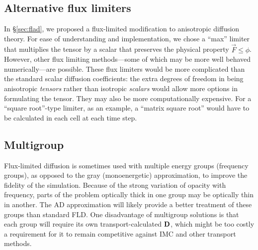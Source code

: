 \subsection{Alternative flux limiters}

In \S\ref{sec:flad}, we proposed a flux-limited modification to anisotropic
diffusion theory. For ease of understanding and implementation, we chose a
``max'' limiter that multiplies the tensor by a scalar that preserves the
physical property $\vec{F} \le \phi$. However, other flux limiting
methods---some of which may be more well behaved numerically---are possible.
These flux limiters would be more complicated than the standard scalar diffusion
coefficients: the extra degrees of freedom in being anisotropic
\emph{tensors} rather than isotropic \emph{scalars} would allow more options in
formulating the tensor.
They may also be more computationally expensive. For a ``square root''-type
limiter, as an
example, a ``matrix square root'' would have to be calculated in each cell at
each time step.


\subsection{Multigroup}

Flux-limited diffusion is sometimes used with multiple energy groups (frequency
groups), as opposed to the gray (monoenergetic) approximation, to improve the
fidelity of the simulation. Because of the strong variation of opacity with
frequency, parts of the problem optically thick in one group may be optically
thin in another. The AD approximation will likely provide a better treatment of
these groups than standard FLD. One disadvantage of multigroup solutions is that
each group will require its own transport-calculated $\mathbf{D}$, which might be
too costly a requirement for it to remain competitive against IMC and other
transport methods.

